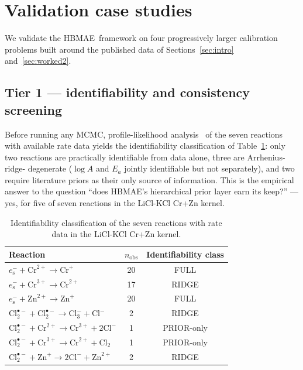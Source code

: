\documentclass[12pt]{article}
\theoremstyle{plain}
\theoremstyle{definition}
\theoremstyle{remark}
\newcommand{\eS}{\ensuremath{e_{\mathrm{s}}^{-}}\xspace}
\newcommand{\Clt}{\ensuremath{\mathrm{Cl}_2^{\bullet-}}\xspace}
\newcommand{\HBMAE}{HBMAE\xspace}
\begin{document}
\section{Validation case studies}\label{sec:validation}

We validate the \HBMAE\ framework on four progressively larger calibration
problems built around the published data of Sections~\ref{sec:intro}
and~\ref{sec:worked2}.

\subsection{Tier 1 --- identifiability and consistency screening}\label{sec:val:tier1}

Before running any MCMC, profile-likelihood analysis~\citep{Raue2009} of
the seven reactions with available rate data yields the identifiability
classification of Table~\ref{tab:identifiability}:  only two reactions are
practically identifiable from data alone, three are Arrhenius-ridge-
degenerate ($\log A$ and $E_a$ jointly identifiable but not separately),
and two require literature priors as their only source of information.
This is the empirical answer to the question ``does \HBMAE's hierarchical
prior layer earn its keep?''  --- yes, for five of seven reactions in the
LiCl-KCl Cr+Zn kernel.

\begin{table}[ht]\centering
\caption{Identifiability classification of the seven reactions with rate data
in the LiCl-KCl Cr+Zn kernel.}
\label{tab:identifiability}
\small
\begin{tabular}{lcc}
\toprule
Reaction & $n_{\mathrm{obs}}$ & Identifiability class \\
\midrule
$\eS+\mathrm{Cr}^{2+} \to \mathrm{Cr}^+$ & 20 & FULL \\
$\eS+\mathrm{Cr}^{3+} \to \mathrm{Cr}^{2+}$ & 17 & RIDGE \\
$\eS+\mathrm{Zn}^{2+} \to \mathrm{Zn}^+$ & 20 & FULL \\
$\Clt+\Clt \to \mathrm{Cl}_3^- + \mathrm{Cl}^-$ & 2 & RIDGE \\
$\Clt+\mathrm{Cr}^{2+} \to \mathrm{Cr}^{3+}+2\mathrm{Cl}^-$ & 1 & PRIOR-only \\
$\Clt+\mathrm{Cr}^{3+} \to \mathrm{Cr}^{2+}+\mathrm{Cl}_2$ & 1 & PRIOR-only \\
$\Clt+\mathrm{Zn}^+ \to 2\mathrm{Cl}^- + \mathrm{Zn}^{2+}$ & 2 & RIDGE \\
\bottomrule
\end{tabular}
\end{table}
\end{document}
